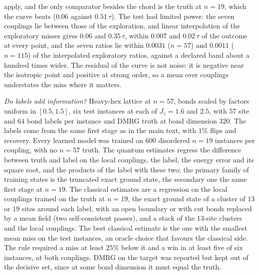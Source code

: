 \documentclass[aps,prx,onecolumn,10pt,nofootinbib,longbibliography,floatfix]{revtex4-2}
\theoremstyle{remark}
\newcommand{\Jz}{J_z}
\begin{document}
apply, and the only comparator besides the chord is the truth at $n=19$, which the curve beats ($0.06$ against $0.51\,\tau$). %
The test had limited power: the seven couplings lie between those of the exploration, and linear interpolation of the
exploratory misses gives $0.06$ and $0.35\,\tau$, within $0.007$ and $0.02\,\tau$ of the outcome at every point, %
and the seven ratios lie within $0.0031$ ($n=57$) and $0.0011$ ($n=115$) of the interpolated exploratory ratios, %
against a declared band about a hundred times wider. The residual of the curve is not noise: it is negative near the
isotropic point and positive at strong order, so a mean over couplings understates the miss where it matters.
\def\SMcap{Test of the bias curve at new couplings (emulated labels): miss of $m_s$ in units of $\tau$, primary label at each point. Ratio: bias over curve.}\def\SMlab{tab:ft_a}


\emph{Do labels add information?} Heavy-hex lattice at $n=57$, bonds scaled by factors uniform in $[0.5,1.5]$, six test %
instances at each of $\Jz=1.6$ and $2.5$, with $57$ site and $64$ bond labels per instance and DMRG truth at bond dimension %
$320$. The labels come from the same first stage as in the main text, with $1\%$ flips and recovery. Every learned model %
was trained on $600$ disordered $n=19$ instances per coupling, with no $n=57$ truth. The quantum estimates regress the %
difference between truth and label on the local couplings, the label, the energy error and its square root, and the
products of the label with these two; the
primary family of training states is the truncated exact ground state, the secondary one the same first stage at $n=19$.
The classical estimates are a regression on the local couplings trained on the truth at $n=19$, the exact ground state
of a cluster of $13$ or $19$ sites around each label, with an open boundary or with cut bonds replaced by a mean field %
(two self-consistent passes), and a stack of the $13$-site clusters and the local couplings. The best classical estimate %
is the one with the smallest mean miss on the test instances, an oracle choice that favours the classical side. The rule
required a miss at least $25\%$ below it and a win in at least five of six instances, at both couplings. DMRG on the %
target was reported but kept out of the decisive set, since at some bond dimension it must equal the truth.
\end{document}

